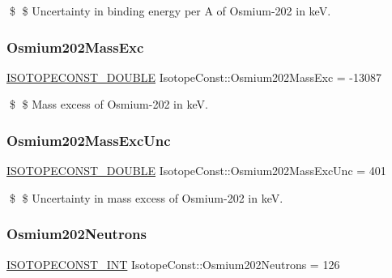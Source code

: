 \$ \$ Uncertainty in binding energy per A of Osmium-\/202 in keV. \mbox{\label{group___isotope_const-_osmium-_os202_gac935b28272b77e0fa898fdcc9ae56732}} 
\subsubsection{\texorpdfstring{Osmium202\+Mass\+Exc}{Osmium202MassExc}}
{\footnotesize\ttfamily \mbox{\hyperlink{group___isotope_const-_macros_ga8f45a7272ce02c0b4c65c44636ed719a}{I\+S\+O\+T\+O\+P\+E\+C\+O\+N\+S\+T\+\_\+\+D\+O\+U\+B\+LE}} Isotope\+Const\+::\+Osmium202\+Mass\+Exc = -\/13087}

\$ \$ Mass excess of Osmium-\/202 in keV. \mbox{\label{group___isotope_const-_osmium-_os202_ga17db136754686884f47c11d40604431c}} 
\subsubsection{\texorpdfstring{Osmium202\+Mass\+Exc\+Unc}{Osmium202MassExcUnc}}
{\footnotesize\ttfamily \mbox{\hyperlink{group___isotope_const-_macros_ga8f45a7272ce02c0b4c65c44636ed719a}{I\+S\+O\+T\+O\+P\+E\+C\+O\+N\+S\+T\+\_\+\+D\+O\+U\+B\+LE}} Isotope\+Const\+::\+Osmium202\+Mass\+Exc\+Unc = 401}

\$ \$ Uncertainty in mass excess of Osmium-\/202 in keV. \mbox{\label{group___isotope_const-_osmium-_os202_ga34734d8dc110f511aa710b1c0f65a546}} 
\subsubsection{\texorpdfstring{Osmium202\+Neutrons}{Osmium202Neutrons}}
{\footnotesize\ttfamily \mbox{\hyperlink{group___isotope_const-_macros_ga5f18360b3e99483a35c32d789e62621c}{I\+S\+O\+T\+O\+P\+E\+C\+O\+N\+S\+T\+\_\+\+I\+NT}} Isotope\+Const\+::\+Osmium202\+Neutrons = 126}

